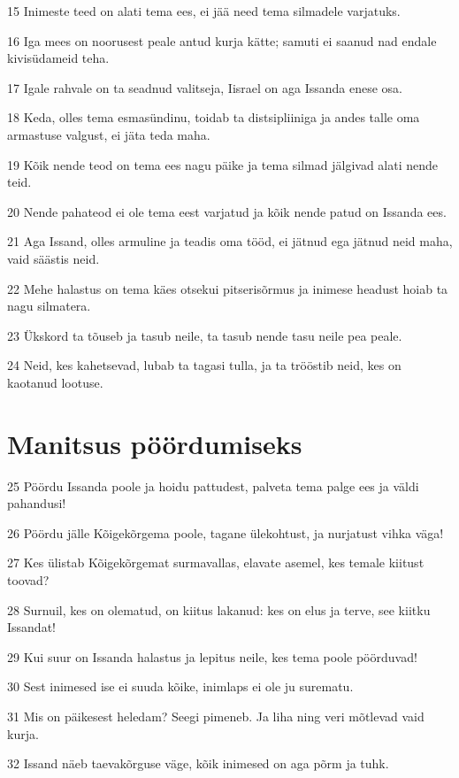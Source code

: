 \par 15 Inimeste teed on alati tema ees, ei jää need tema silmadele varjatuks.
\par 16 Iga mees on noorusest peale antud kurja kätte; samuti ei saanud nad endale kivisüdameid teha.
\par 17 Igale rahvale on ta seadnud valitseja, Iisrael on aga Issanda enese osa.
\par 18 Keda, olles tema esmasündinu, toidab ta distsipliiniga ja andes talle oma armastuse valgust, ei jäta teda maha.
\par 19 Kõik nende teod on tema ees nagu päike ja tema silmad jälgivad alati nende teid.
\par 20 Nende pahateod ei ole tema eest varjatud ja kõik nende patud on Issanda ees.
\par 21 Aga Issand, olles armuline ja teadis oma tööd, ei jätnud ega jätnud neid maha, vaid säästis neid.
\par 22 Mehe halastus on tema käes otsekui pitserisõrmus ja inimese headust hoiab ta nagu silmatera.
\par 23 Ükskord ta tõuseb ja tasub neile, ta tasub nende tasu neile pea peale.
\par 24 Neid, kes kahetsevad, lubab ta tagasi tulla, ja ta trööstib neid, kes on kaotanud lootuse.

\section*{Manitsus pöördumiseks}

\par 25 Pöördu Issanda poole ja hoidu pattudest, palveta tema palge ees ja väldi pahandusi!
\par 26 Pöördu jälle Kõigekõrgema poole, tagane ülekohtust, ja nurjatust vihka väga!
\par 27 Kes ülistab Kõigekõrgemat surmavallas, elavate asemel, kes temale kiitust toovad?
\par 28 Surnuil, kes on olematud, on kiitus lakanud: kes on elus ja terve, see kiitku Issandat!
\par 29 Kui suur on Issanda halastus ja lepitus neile, kes tema poole pöörduvad!
\par 30 Sest inimesed ise ei suuda kõike, inimlaps ei ole ju surematu.
\par 31 Mis on päikesest heledam? Seegi pimeneb. Ja liha ning veri mõtlevad vaid kurja.
\par 32 Issand näeb taevakõrguse väge, kõik inimesed on aga põrm ja tuhk.

